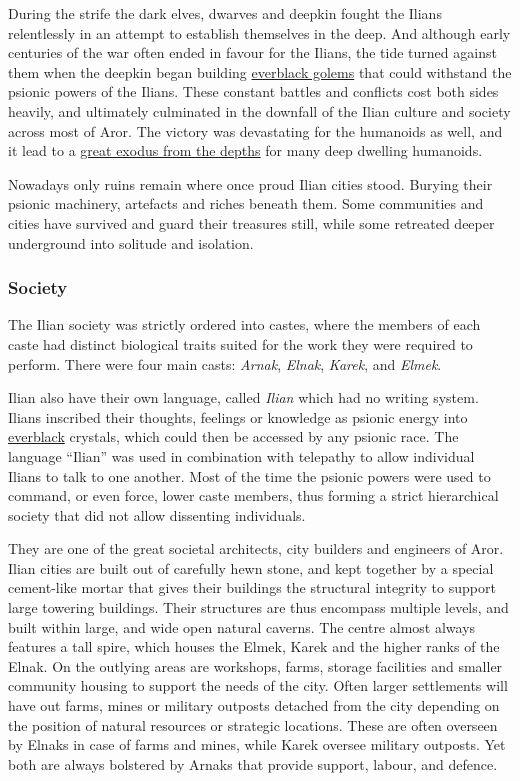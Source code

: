 During the strife the dark elves, dwarves and deepkin fought the Ilians
relentlessly in an attempt to establish themselves in the deep. And although
early centuries of the war often ended in favour for the Ilians, the tide
turned against them when the deepkin began building \hyperref[sec:Everblack
  Golem]{everblack golems} that could withstand the psionic powers of the
Ilians. These constant battles and conflicts cost both sides heavily, and
ultimately culminated in the downfall of the Ilian culture and society across
most of Aror. The victory was devastating for the humanoids as well, and it
lead to a \hyperref[sec:Exodus from the Depths]{great exodus from the depths}
for many deep dwelling humanoids.

Nowadays only ruins remain where once proud Ilian cities stood. Burying their
psionic machinery, artefacts and riches beneath them. Some communities and
cities have survived and guard their treasures still, while some retreated
deeper underground into solitude and isolation.

\subsubsection{Society}

The Ilian society was strictly ordered into castes, where the members of each
caste had distinct biological traits suited for the work they were required to
perform. There were four main casts: \emph{Arnak}, \emph{Elnak}, \emph{Karek},
and \emph{Elmek}.

Ilian also have their own language, called \emph{Ilian} which had no writing
system. Ilians inscribed their thoughts, feelings or knowledge as psionic
energy into \hyperref[sec:Everblack]{everblack} crystals, which could then be
accessed by any psionic race. The language ``Ilian'' was used in combination
with telepathy to allow individual Ilians to talk to one another. Most of the
time the psionic powers were used to command, or even force, lower caste
members, thus forming a strict hierarchical society that did not allow
dissenting individuals.

They are one of the great societal architects, city builders and engineers of
Aror. Ilian cities are built out of carefully hewn stone, and kept together by
a special cement-like mortar that gives their buildings the structural
integrity to support large towering buildings. Their structures are thus
encompass multiple levels, and built within large, and wide open natural
caverns. The centre almost always features a tall spire, which houses the
Elmek, Karek and the higher ranks of the Elnak. On the outlying areas are
workshops, farms, storage facilities and smaller community housing to support
the needs of the city. Often larger settlements will have out farms, mines or
military outposts detached from the city depending on the position of natural
resources or strategic locations. These are often overseen by Elnaks in case
of farms and mines, while Karek oversee military outposts. Yet both are always
bolstered by Arnaks that provide support, labour, and defence.

